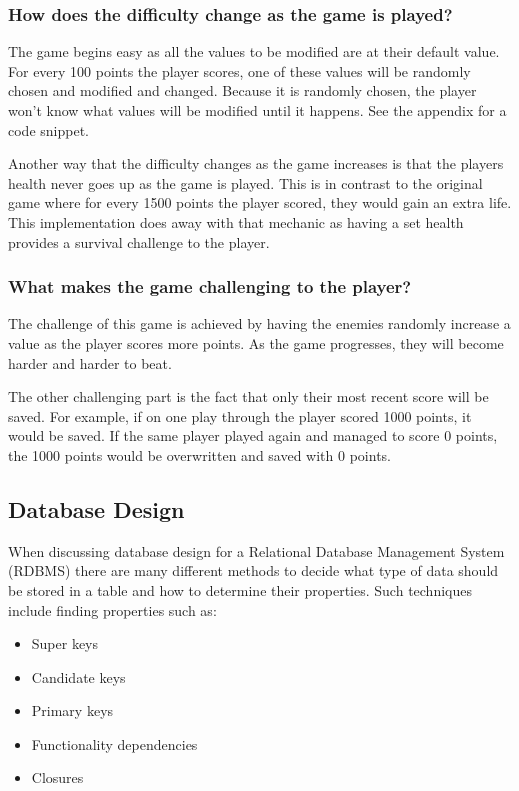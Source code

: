 \documentclass[12pt]{article}
\begin{document}
{\centering \subsubsection{How does the difficulty change as the game is played?}} 
The game begins easy as all the values to be modified are at their default value. For every 100 points the player scores, one of these values will be randomly chosen and modified and changed. Because it is randomly chosen, the player won't know what values will be modified until it happens. See the appendix for a code snippet.

Another way that the difficulty changes as the game increases is that the players health never goes up as the game is played. This is in contrast to the original game where for every 1500 points the player scored, they would gain an extra life. This implementation does away with that mechanic as having a set health provides a survival challenge to the player. 

{\centering \subsubsection{What makes the game challenging to the player?}}
The challenge of this game is achieved by having the enemies randomly increase a value as the player scores more points. As the game progresses, they will become harder and harder to beat. 

The other challenging part is the fact that only their most recent score will be saved. For example, if on one play through the player scored 1000 points, it would be saved. If the same player played again and managed to score 0 points, the 1000 points would be overwritten and saved with 0 points.  

{\centering \subsection{Database Design}}
When discussing database design for a Relational Database Management System (RDBMS) there are many different methods to decide what type of data should be stored in a table and how to determine their properties. Such techniques include finding properties such as: 

\begin{itemize}
\item Super keys
\item Candidate keys
\item Primary keys
\item Functionality dependencies
\item Closures
\end{itemize}
\end{document}
